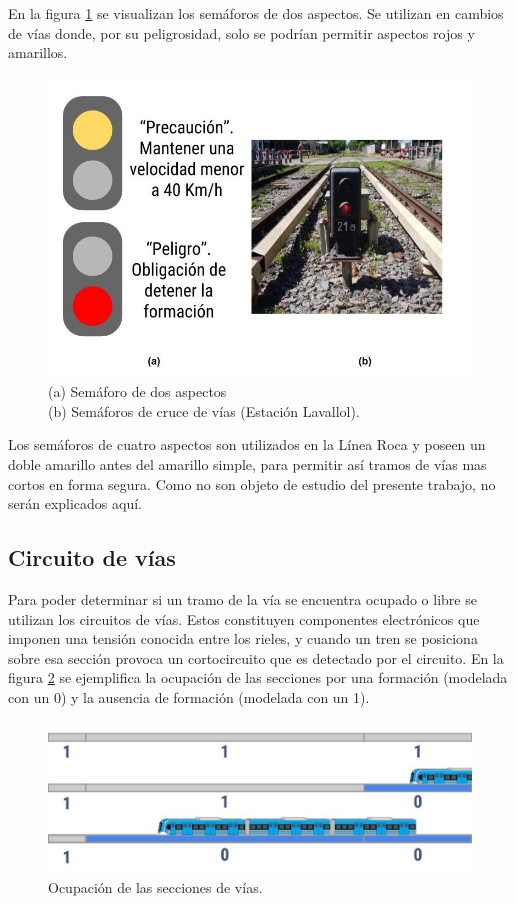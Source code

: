 			En la figura \ref{fig:Sem_2Aspectos} se visualizan los semáforos de dos aspectos. Se utilizan en cambios de vías donde, por su peligrosidad, solo se podrían permitir aspectos rojos y amarillos.
			 
			 \begin{figure}[htbp!]
				\centering
				\includegraphics[scale=.33]{./Figures/Sem2}
				\caption{(a) Semáforo de dos aspectos\\(b) Semáforos de cruce de vías (Estación Lavallol).}
				\label{fig:Sem_2Aspectos}
			\end{figure}				
			
			Los semáforos de cuatro aspectos son utilizados en la Línea Roca y poseen un doble amarillo antes del amarillo simple, para permitir así tramos de vías mas cortos en forma segura. Como no son objeto de estudio del presente trabajo, no serán explicados aquí.
		
		\subsection{Circuito de vías}
		
			Para poder determinar si un tramo de la vía se encuentra ocupado o libre se utilizan los circuitos de vías. Estos constituyen componentes electrónicos que imponen una tensión conocida entre los rieles, y cuando un tren se posiciona sobre esa sección provoca un cortocircuito que es detectado por el circuito. En la figura \ref{fig:Ocupacion} se ejemplifica la ocupación de las secciones por una formación (modelada con un 0) y la ausencia de formación (modelada con un 1).
			
			\begin{figure}[h]
				\centering
				\includegraphics[scale=.4]{./Figures/Ocupacion}
				\caption{Ocupación de las secciones de vías.}
				\label{fig:Ocupacion}
			\end{figure}
			
